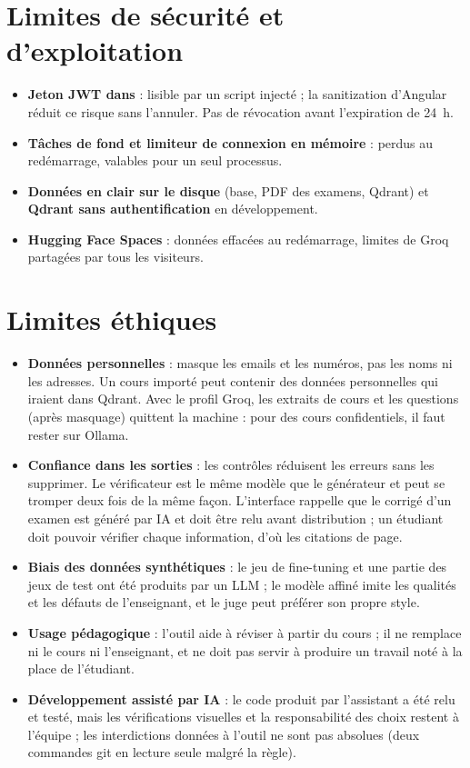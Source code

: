 \documentclass[12pt,a4paper]{report}
\DeclareRobustCommand{\code}[1]{\texttt{\codecasse{#1}}}
\begin{document}
\section{Limites de sécurité et d'exploitation}

\begin{itemize}
  \item \textbf{Jeton JWT dans \code{localStorage}} : lisible par un script injecté ; la sanitization
        d'Angular réduit ce risque sans l'annuler. Pas de révocation avant l'expiration de 24~h.
  \item \textbf{Tâches de fond et limiteur de connexion en mémoire} : perdus au redémarrage, valables pour
        un seul processus.
  \item \textbf{Données en clair sur le disque} (base, PDF des examens, Qdrant) et \textbf{Qdrant sans
        authentification} en développement.
  \item \textbf{Hugging Face Spaces} : données effacées au redémarrage, limites de Groq partagées par tous
        les visiteurs.
\end{itemize}

\section{Limites éthiques}

\begin{itemize}
  \item \textbf{Données personnelles} : \code{mask_pii} masque les emails et les numéros, pas les noms ni
        les adresses. Un cours importé peut contenir des données personnelles qui iraient dans Qdrant. Avec
        le profil Groq, les extraits de cours et les questions (après masquage) quittent la machine : pour
        des cours confidentiels, il faut rester sur Ollama.
  \item \textbf{Confiance dans les sorties} : les contrôles réduisent les erreurs sans les supprimer. Le
        vérificateur est le même modèle que le générateur et peut se tromper deux fois de la même façon.
        L'interface rappelle que le corrigé d'un examen est généré par IA et doit être relu avant
        distribution ; un étudiant doit pouvoir vérifier chaque information, d'où les citations de page.
  \item \textbf{Biais des données synthétiques} : le jeu de fine-tuning et une partie des jeux de test ont
        été produits par un LLM ; le modèle affiné imite les qualités et les défauts de l'enseignant, et le
        juge peut préférer son propre style.
  \item \textbf{Usage pédagogique} : l'outil aide à réviser à partir du cours ; il ne remplace ni le cours
        ni l'enseignant, et ne doit pas servir à produire un travail noté à la place de l'étudiant.
  \item \textbf{Développement assisté par IA} : le code produit par l'assistant a été relu et testé, mais
        les vérifications visuelles et la responsabilité des choix restent à l'équipe ; les interdictions
        données à l'outil ne sont pas absolues (deux commandes git en lecture seule malgré la règle).
\end{itemize}
\end{document}
